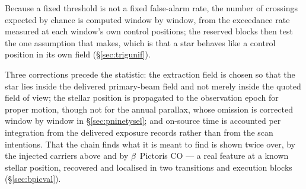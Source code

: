 Because a fixed threshold is not a fixed false-alarm rate, the number of
crossings expected by chance is computed window by window, from the
exceedance rate measured at each window's own control positions; the reserved
blocks then test the one assumption that makes, which is that a star behaves
like a control position in its own field (\S\ref{sec:trigunif}).

Three corrections precede the statistic: the extraction field is chosen so
that the star lies inside the delivered primary-beam field and not merely
inside the quoted field of view; the stellar position is propagated to the
observation epoch for proper motion, though not for the annual parallax,
whose omission is corrected window by window in
\S\ref{sec:pninetysel}; and on-source time is accounted per integration
from the
delivered exposure records rather than from the scan intentions. That the
chain finds what it is meant to find is shown twice over, by the injected
carriers above and by $\beta$~Pictoris CO --- a real feature at a known
stellar position, recovered and localised in two transitions and
\NStageOneBpicEb{} execution blocks (\S\ref{sec:bpicval}).

